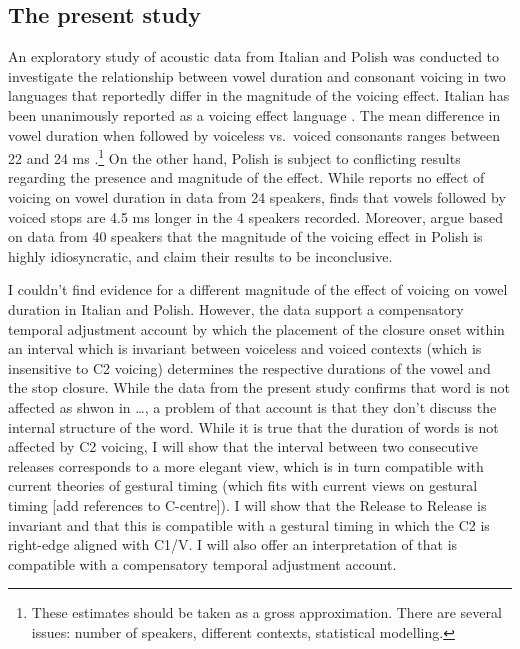 \documentclass[]{JASAnew}
\begin{document}
\hypertarget{the-present-study}{%
\subsection{The present study}\label{the-present-study}}

An exploratory study of acoustic data from Italian and Polish was
conducted to investigate the relationship between vowel duration and
consonant voicing in two languages that reportedly differ in the
magnitude of the voicing effect. Italian has been unanimously reported
as a voicing effect language
\citep{caldognetto1979, farnetani1986, esposito2002}. The mean
difference in vowel duration when followed by voiceless vs.~voiced
consonants ranges between 22 and 24 ms \citep[with longer vowels
followed by voiced
consonants,][]{farnetani1986, esposito2002}.\footnote{These estimates should be taken as a gross approximation.
There are several issues: number of speakers, different contexts, statistical modelling.}
On the other hand, Polish is subject to conflicting results regarding
the presence and magnitude of the effect. While \citet{keating1984}
reports no effect of voicing on vowel duration in data from 24 speakers,
\citet{nowak2006} finds that vowels followed by voiced stops are 4.5 ms
longer in the 4 speakers recorded. Moreover, \citet{malisz2008} argue
based on data from 40 speakers that the magnitude of the voicing effect
in Polish is highly idiosyncratic, and claim their results to be
inconclusive.

I couldn't find evidence for a different magnitude of the effect of
voicing on vowel duration in Italian and Polish. However, the data
support a compensatory temporal adjustment account by which the
placement of the closure onset within an interval which is invariant
between voiceless and voiced contexts (which is insensitive to C2
voicing) determines the respective durations of the vowel and the stop
closure. While the data from the present study confirms that word is not
affected as shwon in \ldots{}, a problem of that account is that they
don't discuss the internal structure of the word. While it is true that
the duration of words is not affected by C2 voicing, I will show that
the interval between two consecutive releases corresponds to a more
elegant view, which is in turn compatible with current theories of
gestural timing (which fits with current views on gestural timing {[}add
references to C-centre{]}). I will show that the Release to Release is
invariant and that this is compatible with a gestural timing in which
the C2 is right-edge aligned with C1/V. I will also offer an
interpretation of \citet{maddieson1976} that is compatible with a
compensatory temporal adjustment account.
\end{document}
